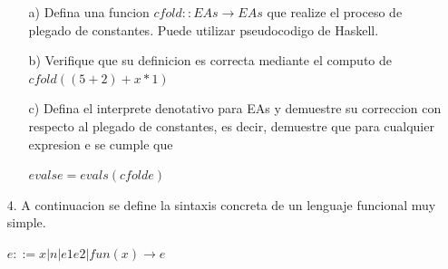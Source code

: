 \documentclass{article}
\begin{document}
\begin{itemize}
            \begin{itemize}
                \item[a)] Defina una funcion $cfold :: EAs \rightarrow EAs$ que realize el proceso de plegado de constantes. Puede utilizar pseudocodigo de Haskell.
                \item[b)] Verifique que su definicion es correcta mediante el computo de $cfold((5 + 2) + x * 1)$
                \item[c)] Defina el interprete denotativo para EAs y demuestre su correccion con respecto al plegado de constantes, es decir, demuestre que para cualquier expresion e se cumple que
                    \begin{center}
                        $eval s e = eval s (cfold e)$
                    \end{center}
            \end{itemize}

        \item[4.] A continuacion se define la sintaxis concreta de un lenguaje funcional muy simple.
            \begin{center}
                $e ::= x | n | e1 e2 | fun (x) \rightarrow e$
            \end{center}


\end{itemize}
\end{document}
